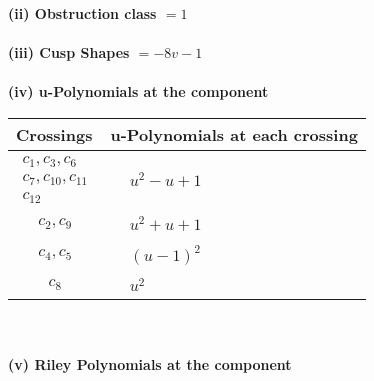 \documentclass[1p]{elsarticle_modified}
\theoremstyle{definition}
\begin{document}
\flushleft \textbf{(ii) Obstruction class $= 1$}\\~\\
\flushleft \textbf{(iii) Cusp Shapes $= -8 v-1$}\\~\\
\newpage\renewcommand{\arraystretch}{1}
\flushleft \textbf{(iv) u-Polynomials at the component}\newline \\
\begin{tabular}{m{50pt}|m{274pt}}
Crossings & \hspace{64pt}u-Polynomials at each crossing \\
\hline $$\begin{aligned}c_{1},c_{3},c_{6}\\c_{7},c_{10},c_{11}\\c_{12}\end{aligned}$$&$\begin{aligned}
&u^2- u+1
\end{aligned}$\\
\hline $$\begin{aligned}c_{2},c_{9}\end{aligned}$$&$\begin{aligned}
&u^2+u+1
\end{aligned}$\\
\hline $$\begin{aligned}c_{4},c_{5}\end{aligned}$$&$\begin{aligned}
&(u-1)^2
\end{aligned}$\\
\hline $$\begin{aligned}c_{8}\end{aligned}$$&$\begin{aligned}
&u^2
\end{aligned}$\\
\hline
\end{tabular}\\~\\
\newpage\renewcommand{\arraystretch}{1}
\flushleft \textbf{(v) Riley Polynomials at the component}\newline \\
\end{document}
